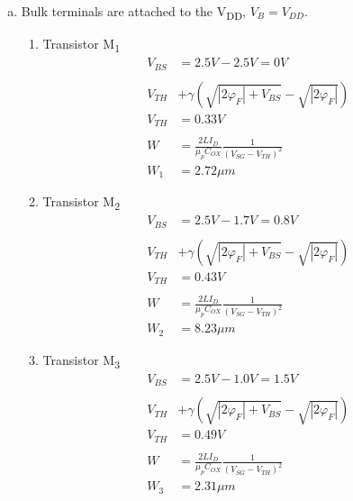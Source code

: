 \documentclass{article}
\begin{document}
\begin{enumerate}[(a)]
\item Bulk terminals are attached to the V\textsubscript{DD}, \(V_{B} = V_{DD}\).
\begin{enumerate}[1.]
\item Transistor M\textsubscript{1}
\begin{equation*}
\begin{aligned}
V_{BS} &= 2.5 V - 2.5 V = 0 V \\
\\
V_{TH} & + \gamma{}(\sqrt{|2\varphi_{F}| + V_{BS}} - \sqrt{|2\varphi_{F}|}) \\
V_{TH} & = 0.33 V \\
\\
W &= \frac{2LI_{D}}{\mu_{p}C_{OX}}\frac{1}{(V_{SG} - V_{TH})^{2}} \\
W_{1} &= 2.72 \mu{}m
\end{aligned}
\end{equation*}

\item Transistor M\textsubscript{2}
\begin{equation*}
\begin{aligned}
V_{BS} &= 2.5 V - 1.7 V = 0.8 V \\
\\
V_{TH} & + \gamma{}(\sqrt{|2\varphi_{F}| + V_{BS}} - \sqrt{|2\varphi_{F}|}) \\
V_{TH} & = 0.43 V \\
\\
W &= \frac{2LI_{D}}{\mu_{p}C_{OX}}\frac{1}{(V_{SG} - V_{TH})^{2}} \\
W_{2} &= 8.23 \mu{}m
\end{aligned}
\end{equation*}

\item Transistor M\textsubscript{3}
\begin{equation*}
\begin{aligned}
V_{BS} &= 2.5 V - 1.0 V = 1.5 V \\
\\
V_{TH} & + \gamma{}(\sqrt{|2\varphi_{F}| + V_{BS}} - \sqrt{|2\varphi_{F}|}) \\
V_{TH} & = 0.49 V \\
\\
W &= \frac{2LI_{D}}{\mu_{p}C_{OX}}\frac{1}{(V_{SG} - V_{TH})^{2}} \\
W_{3} &= 2.31 \mu{}m
\end{aligned}
\end{equation*}
\end{enumerate}
\end{enumerate}
\end{document}
